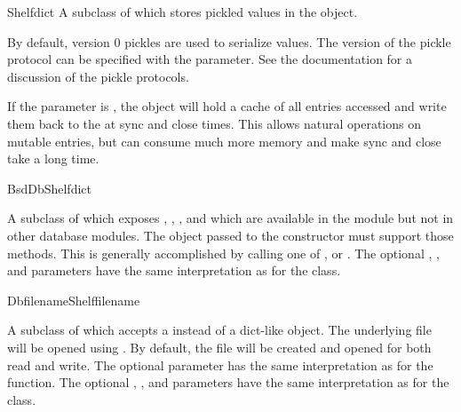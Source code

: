 \begin{classdesc}{Shelf}{dict}
A subclass of  which stores pickled values in the
 object.  

By default, version 0 pickles are used to serialize values.  The
version of the pickle protocol can be specified with the
 parameter. See the  documentation for a
discussion of the pickle protocols. 

If the  parameter is , the object will hold a
cache of all entries accessed and write them back to the  at
sync and close times.  This allows natural operations on mutable entries,
but can consume much more memory and make sync and close take a long time.
\end{classdesc}

\begin{classdesc}{BsdDbShelf}{dict}

A subclass of  which exposes ,
, ,  and
 which are available in the  module
but not in other database modules.  The  object passed to
the constructor must support those methods.  This is generally
accomplished by calling one of ,
 or .  The optional
, , and  parameters have the
same interpretation as for the  class.

\end{classdesc}

\begin{classdesc}{DbfilenameShelf}{filename}

A subclass of  which accepts a  instead of
a dict-like object.  The underlying file will be opened using
{}.  By default, the file will be created and
opened for both read and write.  The optional  parameter has
the same interpretation as for the  function.  The
optional , , and  parameters
have the same interpretation as for the  class.
 
\end{classdesc}

